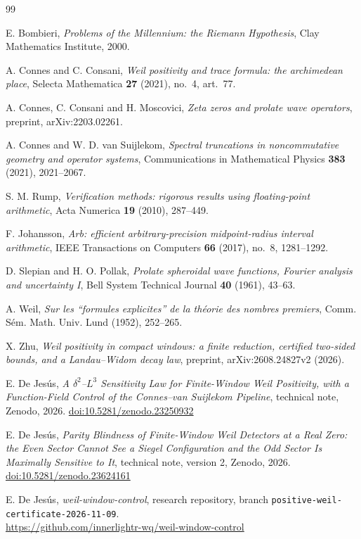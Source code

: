 \documentclass[11pt,a4paper]{article}
\theoremstyle{definition}
\theoremstyle{remark}
\begin{document}
\begin{thebibliography}{99}

 E. Bombieri,
\emph{Problems of the Millennium: the Riemann Hypothesis},
Clay Mathematics Institute, 2000.

 A. Connes and C. Consani,
\emph{Weil positivity and trace formula: the archimedean place},
Selecta Mathematica \textbf{27} (2021), no.~4, art.~77.

 A. Connes, C. Consani and H. Moscovici,
\emph{Zeta zeros and prolate wave operators},
preprint, arXiv:2203.02261.

 A. Connes and W. D. van Suijlekom,
\emph{Spectral truncations in noncommutative geometry and operator systems},
Communications in Mathematical Physics \textbf{383} (2021), 2021--2067.

 S. M. Rump,
\emph{Verification methods: rigorous results using floating-point arithmetic},
Acta Numerica \textbf{19} (2010), 287--449.

 F. Johansson,
\emph{Arb: efficient arbitrary-precision midpoint-radius interval arithmetic},
IEEE Transactions on Computers \textbf{66} (2017), no.~8, 1281--1292.

 D. Slepian and H. O. Pollak,
\emph{Prolate spheroidal wave functions, Fourier analysis and uncertainty I},
Bell System Technical Journal \textbf{40} (1961), 43--63.

 A. Weil,
\emph{Sur les ``formules explicites'' de la th\'eorie des nombres premiers},
Comm. S\'em. Math. Univ. Lund (1952), 252--265.

 X. Zhu,
\emph{Weil positivity in compact windows: a finite reduction, certified
two-sided bounds, and a Landau--Widom decay law},
preprint, arXiv:2608.24827v2 (2026).

 E. De Jes\'us,
\emph{A $\delta^2$--$L^3$ Sensitivity Law for Finite-Window Weil Positivity,
with a Function-Field Control of the Connes--van Suijlekom Pipeline},
technical note, Zenodo, 2026.
\href{https://doi.org/10.5281/zenodo.23250932}{doi:10.5281/zenodo.23250932}

 E. De Jes\'us,
\emph{Parity Blindness of Finite-Window Weil Detectors at a Real Zero:
the Even Sector Cannot See a Siegel Configuration and the Odd Sector Is
Maximally Sensitive to It},
technical note, version 2, Zenodo, 2026.
\href{https://doi.org/10.5281/zenodo.23624161}{doi:10.5281/zenodo.23624161}

 E. De Jes\'us,
\emph{weil-window-control}, research repository, branch
\texttt{positive-weil-certificate-2026-11-09}.\\
\url{https://github.com/innerlightr-wq/weil-window-control}

\end{thebibliography}
\end{document}
